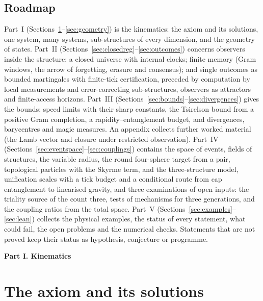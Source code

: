 \documentclass[aps,pra,onecolumn,superscriptaddress,nofootinbib,10pt]{revtex4-2}
\theoremstyle{definition}
\theoremstyle{remark}
\newcommand{\paperpart}[1]{\par\bigskip\begin{center}\large\bfseries #1\end{center}\par\medskip}
\begin{document}
\subsection{Roadmap}
Part~I (Sections~\ref{sec:axiom}--\ref{sec:geometry}) is the kinematics: the axiom and its solutions, one
system, many systems, sub-structures of every dimension, and the geometry of states.  Part~II
(Sections~\ref{sec:closedreg}--\ref{sec:outcomes}) concerns observers inside the structure: a closed universe with internal
clocks; finite memory (Gram windows, the arrow of forgetting, erasure and consensus); and single outcomes as
bounded martingales with finite-tick certification, preceded by computation by local measurements
and error-correcting sub-structures, observers as attractors and finite-access horizons.  Part~III (Sections~\ref{sec:bounds}--\ref{sec:divergences}) gives the bounds: speed limits with their
sharp constants, the Tsirelson bound from a positive Gram completion, a rapidity--entanglement budget,
and divergences, barycentres and magic measures.  An appendix collects further worked material (the Lamb
vector and closure under restricted observation).  Part~IV (Sections~\ref{sec:eventspace}--\ref{sec:couplings}) contains the space of events,
fields of structures, the variable radius, the round four-sphere target from a pair, topological
particles with the Skyrme term, and the
three-structure model, unification scales with a tick budget and a conditional route from cap
entanglement to linearised gravity, and three examinations of open inputs: the triality source of the
count three, tests of mechanisms for three generations, and the coupling ratios from the total space.  Part~V (Sections~\ref{sec:examples}--\ref{sec:lean}) collects the
physical examples, the status of every statement, what could fail, the open problems and the
numerical checks.  Statements that are not proved keep their status as hypothesis, conjecture or
programme.

\paperpart{Part I.  Kinematics}

\section{The axiom and its solutions}\label{sec:axiom}
\end{document}
